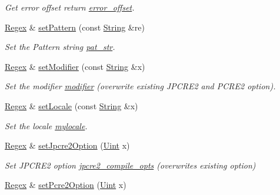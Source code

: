 \begin{DoxyCompactItemize}
\begin{DoxyCompactList}\small\item\em Get error offset return \hyperlink{classjpcre2_1_1Regex_a0b9613704582b9c6b0175a21a2a421e0}{error\+\_\+offset}. \end{DoxyCompactList}\item 
\hyperlink{classjpcre2_1_1Regex}{Regex} \& \hyperlink{classjpcre2_1_1Regex_a85d9a514ea86ae68533223adac6c6bd8}{set\+Pattern} (const \hyperlink{namespacejpcre2_a91f03070152fb228bc116c5a737f1d16}{String} \&re)
\begin{DoxyCompactList}\small\item\em Set the Pattern string \hyperlink{classjpcre2_1_1Regex_a0bceb85b6dbba355b56b5cc312214435}{pat\+\_\+str}. \end{DoxyCompactList}\item 
\hyperlink{classjpcre2_1_1Regex}{Regex} \& \hyperlink{classjpcre2_1_1Regex_aed9865b58c60945e19f36fa310f5a595}{set\+Modifier} (const \hyperlink{namespacejpcre2_a91f03070152fb228bc116c5a737f1d16}{String} \&x)
\begin{DoxyCompactList}\small\item\em Set the modifier \hyperlink{classjpcre2_1_1Regex_ab4447726c0cedd7868a600ea7db876a8}{modifier} (overwrite existing J\+P\+C\+R\+E2 and P\+C\+R\+E2 option). \end{DoxyCompactList}\item 
\hyperlink{classjpcre2_1_1Regex}{Regex} \& \hyperlink{classjpcre2_1_1Regex_a56721534519e5cb436337043eee8f42d}{set\+Locale} (const \hyperlink{namespacejpcre2_a91f03070152fb228bc116c5a737f1d16}{String} \&x)
\begin{DoxyCompactList}\small\item\em Set the locale \hyperlink{classjpcre2_1_1Regex_a92a3ad992cade62d103248302f7e2f2d}{mylocale}. \end{DoxyCompactList}\item 
\hyperlink{classjpcre2_1_1Regex}{Regex} \& \hyperlink{classjpcre2_1_1Regex_a031617a19638ef752dcd2b29fa3464d5}{set\+Jpcre2\+Option} (\hyperlink{namespacejpcre2_a078242d38221a13fb3543b9edd78c099}{Uint} x)
\begin{DoxyCompactList}\small\item\em Set J\+P\+C\+R\+E2 option \hyperlink{classjpcre2_1_1Regex_abdd26c3bc1c3132f0aa73dde1690a7ef}{jpcre2\+\_\+compile\+\_\+opts} (overwrites existing option) \end{DoxyCompactList}\item 
\hyperlink{classjpcre2_1_1Regex}{Regex} \& \hyperlink{classjpcre2_1_1Regex_acdc6f97f4030ae109c4e1a4e2310bceb}{set\+Pcre2\+Option} (\hyperlink{namespacejpcre2_a078242d38221a13fb3543b9edd78c099}{Uint} x)

\end{DoxyCompactItemize}
